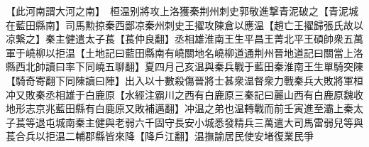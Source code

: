 【此河南謂大河之南】　桓温别將攻上洛獲秦荆州刺史郭敬進撃青泥破之【青泥城在藍田縣南】司馬勲掠秦西鄙凉秦州刺史王擢攻陳倉以應温【趙亡王擢歸張氏故以凉繋之】秦主健遣太子萇【萇仲良翻】丞相雄淮南王生平昌王菁北平王碩帥衆五萬軍于嶢柳以拒温【土地記曰藍田縣南有嶢關地名嶢柳道通荆州晉地道記曰關當上洛縣西北帥讀曰率下同嶢五聊翻】夏四月己亥温與秦兵戰于藍田秦淮南王生單騎突陳【騎奇寄翻下同陳讀曰陣】出入以十數殺傷晉將士甚衆温督衆力戰秦兵大敗將軍桓冲又敗秦丞相雄于白鹿原【水經注霸川之西有白鹿原三秦記曰麗山西有白鹿原魏收地形志京兆藍田縣有白鹿原又敗補邁翻】冲温之弟也温轉戰而前壬寅進至灞上秦太子萇等退屯城南秦主健與老弱六千固守長安小城悉發精兵三萬遣大司馬雷弱兒等與萇合兵以拒温二輔郡縣皆來降【降戶江翻】温撫諭居民使安堵復業民爭